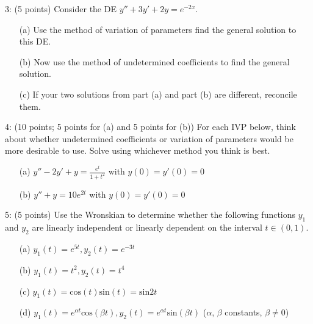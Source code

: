 \documentclass[12pt,letterpaper]{hmcpset}
\begin{document}
\begin{problem}
3: (5 points) Consider the DE $y'' + 3y' + 2y = e^{-2x}$.

\begin{enumerate}
    \item[(a)] Use the method of variation of parameters find the general solution to this DE.
    \item[(b)] Now use the method of undetermined coefficients to find the general solution.
    \item[(c)] If your two solutions from part (a) and part (b) are different, reconcile them.
\end{enumerate}
\end{problem}
\newpage

\begin{problem}
4: (10 points; 5 points for (a) and 5 points for (b)) For each IVP below, think about whether undetermined coefficients or variation of parameters would be more desirable to use. Solve using whichever method you think is best.
\begin{enumerate}
    \item[(a)] $y'' - 2y' + y= \frac{e^t}{1+t^2}$ with $y(0) = y'(0)=0$
    \item[(b)] $y'' +  y= 10e^{2t}$ with $y(0) = y'(0)=0$
\end{enumerate}

\end{problem}
\newpage

\begin{problem}
5: (5 points) Use the Wronskian to determine whether the following functions $y_1$ and $y_2$ are
linearly independent or linearly dependent on the interval $t \in (0, 1)$.
\begin{enumerate}
    \item[(a)] $y_1(t) = e^{5t}, y_2(t) = e^{-3t}$
    \item[(b)] $y_1(t) = t^2, y_2(t) = t^4$
    \item[(c)] $y_1(t) = \text{cos}(t) \text{sin}(t) = \text{sin}2t$
    \item[(d)] $y_1(t) = e^{\alpha t}\text{cos}(\beta t), y_2(t) = e^{\alpha t}\text{sin}(\beta t)$ ($\alpha$, $\beta$ constants, $\beta \neq 0$)
\end{enumerate}
\end{problem}
\newpage
\end{document}

